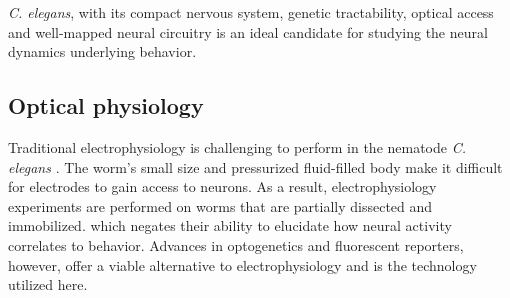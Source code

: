\textit{C. elegans}, with its compact nervous system, genetic tractability,  optical access and well-mapped neural circuitry is an ideal candidate for studying the neural dynamics underlying behavior.




\subsection{Optical physiology}
Traditional electrophysiology is challenging to perform in the nematode \textit{C. elegans} \citep{goodman_active_1998, schafer_neurophysiological_2006}. The worm's small size and pressurized fluid-filled body make it difficult for electrodes to gain access to neurons.  As a result, electrophysiology experiments are  performed on worms that are partially dissected and immobilized. 
 which negates their ability to elucidate how neural activity correlates to behavior. Advances in optogenetics and fluorescent reporters, however,  offer a viable alternative to electrophysiology and is the technology utilized here.

 

